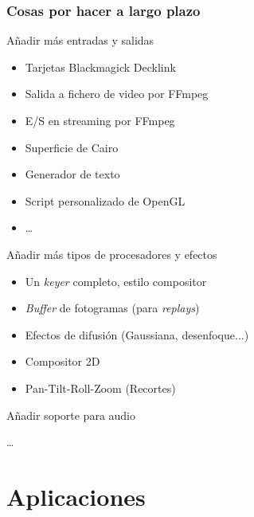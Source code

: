 \documentclass{beamer}
\begin{document}
\begin{frame}[t] \frametitle{Cosas por hacer a largo plazo}
	\begin{itemize}
		\begin{item}
			Añadir más entradas y salidas
			\begin{itemize}
				\item{Tarjetas Blackmagick Decklink}
				\item{Salida a fichero de video por FFmpeg}
				\item{E/S en streaming por FFmpeg}
				\item{Superficie de Cairo}
				\item{Generador de texto}
				\item{Script personalizado de OpenGL}
				\item{\ldots}
			\end{itemize}
		\end{item}
		\begin{item}
			Añadir más tipos de procesadores y efectos
			\begin{itemize}
				\item{Un \textit{keyer} completo, estilo compositor}
				\item{\textit{Buffer} de fotogramas (para \textit{replays})}
				\item{Efectos de difusión (Gaussiana, desenfoque...)}
				\item{Compositor 2D}
				\item{Pan-Tilt-Roll-Zoom (Recortes)}
			\end{itemize}
		\end{item}
		\begin{item}
			Añadir soporte para audio
		\end{item}
		\begin{item}
			\ldots
		\end{item}
	\end{itemize}
\end{frame}

%
%
\section{Aplicaciones}
\end{document}
